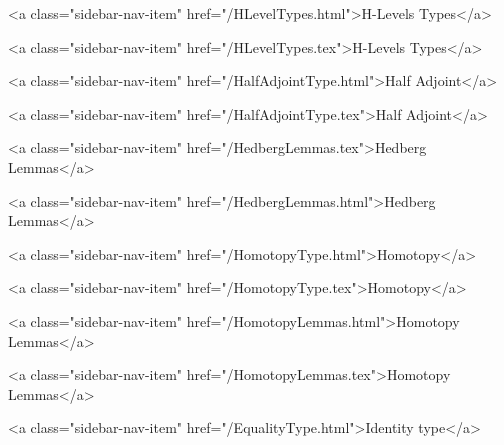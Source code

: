       
        
          <a class="sidebar-nav-item" href="/HLevelTypes.html">H-Levels Types</a>
        
      
    
      
        
          <a class="sidebar-nav-item" href="/HLevelTypes.tex">H-Levels Types</a>
        
      
    
      
        
          <a class="sidebar-nav-item" href="/HalfAdjointType.html">Half Adjoint</a>
        
      
    
      
        
          <a class="sidebar-nav-item" href="/HalfAdjointType.tex">Half Adjoint</a>
        
      
    
      
        
          <a class="sidebar-nav-item" href="/HedbergLemmas.tex">Hedberg Lemmas</a>
        
      
    
      
        
          <a class="sidebar-nav-item" href="/HedbergLemmas.html">Hedberg Lemmas</a>
        
      
    
      
        
          <a class="sidebar-nav-item" href="/HomotopyType.html">Homotopy</a>
        
      
    
      
        
          <a class="sidebar-nav-item" href="/HomotopyType.tex">Homotopy</a>
        
      
    
      
        
          <a class="sidebar-nav-item" href="/HomotopyLemmas.html">Homotopy Lemmas</a>
        
      
    
      
        
          <a class="sidebar-nav-item" href="/HomotopyLemmas.tex">Homotopy Lemmas</a>
        
      
    
      
        
          <a class="sidebar-nav-item" href="/EqualityType.html">Identity type</a>
        
      
    
